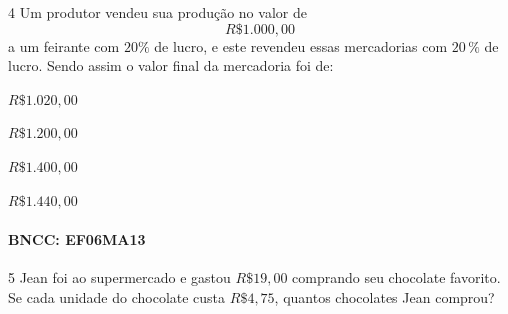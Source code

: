 
\num{4}  Um produtor vendeu sua produção no valor de $$R\$1.000,00$$ a um
feirante com $20\%$ de lucro, e este revendeu essas mercadorias com $20\,\%$
de lucro. Sendo assim o valor final da mercadoria foi de:

\begin{escolha}
\item $R\$1.020,00$
\item $R\$1.200,00$
\item $R\$1.400,00$
\item $R\$1.440,00$
\end{escolha}

\paragraph{BNCC: EF06MA13 }


\num{5}  Jean foi ao supermercado e gastou $R\$19,00$ comprando seu chocolate
favorito. Se cada unidade do chocolate custa $R\$4,75$, quantos
chocolates Jean comprou?

